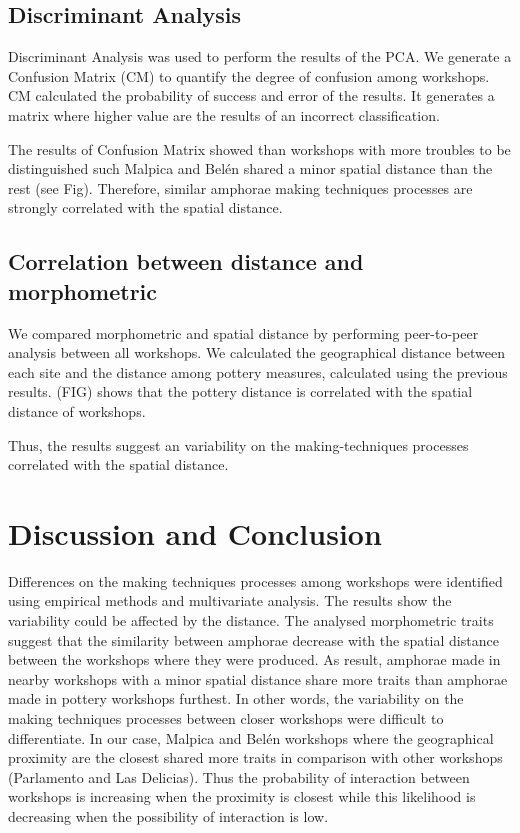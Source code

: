 \documentclass[review]{elsarticle}
\begin{document}
\subsection{Discriminant Analysis}


Discriminant Analysis was used to perform the results of the PCA. We generate a Confusion Matrix (CM) to quantify the degree of confusion among workshops. CM calculated the probability of success and error of the results. It generates a matrix where higher value are the results of an incorrect classification. 

The results of Confusion Matrix showed than workshops with more troubles to be distinguished such Malpica and Bel\'en shared a minor spatial distance than the rest (see Fig). Therefore, similar amphorae making techniques processes are strongly correlated with the spatial distance. 



\subsection{Correlation between distance and morphometric}

We compared morphometric and spatial distance by performing peer-to-peer analysis between all workshops. We calculated the geographical distance between each site and the distance among pottery measures, calculated using the previous results. (FIG) shows that the pottery distance is correlated with the spatial distance of workshops.




Thus, the results suggest an variability on the making-techniques processes correlated with the spatial distance. 

\section{Discussion and Conclusion}


Differences on the making techniques processes among workshops were identified using empirical methods and multivariate analysis. The results show the variability could be affected by the distance. The analysed morphometric traits suggest that the similarity between amphorae decrease with the spatial distance between the workshops where they were produced. As result, amphorae made in nearby workshops with a minor spatial distance share more traits than amphorae made in pottery workshops furthest. In other words, the variability on the making techniques processes between closer workshops were difficult to differentiate. In our case, Malpica and Bel\'en workshops where the geographical proximity are the closest shared more traits in comparison with other workshops (Parlamento and Las Delicias). Thus the probability of interaction between workshops is increasing when the proximity is closest while this likelihood is decreasing when the possibility of interaction is low. 
\end{document}
